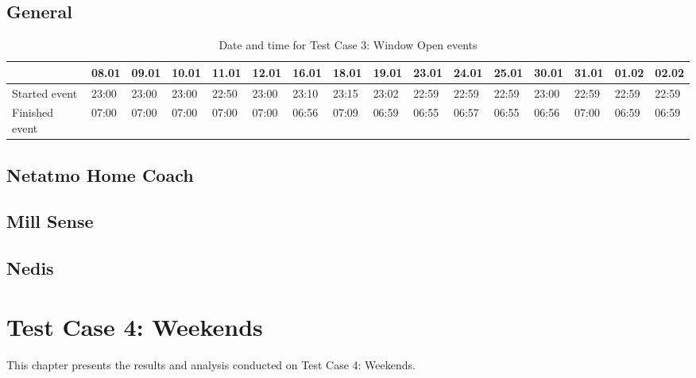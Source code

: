 \subsection{General}
\begin{table}[!hbtp]
    \centering
    \begin{adjustbox}{width=1\textwidth} 
            \begin{tabular}{l|l|l|l|l|l|l|l|l|l|l|l|l|l|l|l|}
                \cline{2-16}
                & 08.01 & 09.01 & 10.01 & 11.01 & 12.01 & 16.01 & 18.01 & 19.01 & 23.01 & 24.01 & 25.01 & 30.01 & 31.01 & 01.02 & 02.02 \\ \hline
                \multicolumn{1}{|l|}{Started event}  & 23:00 & 23:00 & 23:00 & 22:50 & 23:00 & 23:10 & 23:15 & 23:02 & 22:59 & 22:59 & 22:59 & 23:00 & 22:59 & 22:59 & 22:59 \\ \hline
                \multicolumn{1}{|l|}{Finished event} & 07:00 & 07:00 & 07:00 & 07:00 & 07:00 & 06:56 & 07:09 & 06:59 & 06:55 & 06:57 & 06:55 & 06:56 & 07:00 & 06:59 & 06:59 \\ \hline
            \end{tabular}
    \end{adjustbox}
    \caption{Date and time for Test Case 3: Window Open events}
    \label{tab:WindowDates}
\end{table}
\subsection{Netatmo Home Coach}
\subsection{Mill Sense}
\subsection{Nedis}

\section{Test Case 4: Weekends}
This chapter presents the results and analysis conducted on Test Case 4: Weekends. 
